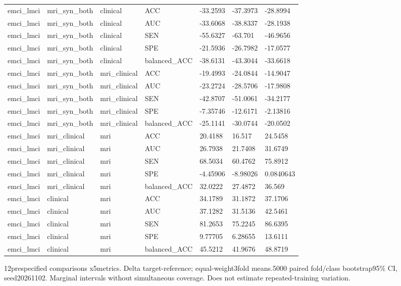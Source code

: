\begin{landscape}
\begin{longtable}{lllllll}
emci\_lmci & mri\_syn\_both & clinical & ACC & -33.2593 & -37.3973 & -28.8994 \\
emci\_lmci & mri\_syn\_both & clinical & AUC & -33.6068 & -38.8337 & -28.1938 \\
emci\_lmci & mri\_syn\_both & clinical & SEN & -55.6327 & -63.701 & -46.9656 \\
emci\_lmci & mri\_syn\_both & clinical & SPE & -21.5936 & -26.7982 & -17.0577 \\
emci\_lmci & mri\_syn\_both & clinical & balanced\_ACC & -38.6131 & -43.3044 & -33.6618 \\
emci\_lmci & mri\_syn\_both & mri\_clinical & ACC & -19.4993 & -24.0844 & -14.9047 \\
emci\_lmci & mri\_syn\_both & mri\_clinical & AUC & -23.2724 & -28.5706 & -17.9808 \\
emci\_lmci & mri\_syn\_both & mri\_clinical & SEN & -42.8707 & -51.0061 & -34.2177 \\
emci\_lmci & mri\_syn\_both & mri\_clinical & SPE & -7.35746 & -12.6171 & -2.13816 \\
emci\_lmci & mri\_syn\_both & mri\_clinical & balanced\_ACC & -25.1141 & -30.0744 & -20.0502 \\
emci\_lmci & mri\_clinical & mri & ACC & 20.4188 & 16.517 & 24.5458 \\
emci\_lmci & mri\_clinical & mri & AUC & 26.7938 & 21.7408 & 31.6749 \\
emci\_lmci & mri\_clinical & mri & SEN & 68.5034 & 60.4762 & 75.8912 \\
emci\_lmci & mri\_clinical & mri & SPE & -4.45906 & -8.98026 & 0.0840643 \\
emci\_lmci & mri\_clinical & mri & balanced\_ACC & 32.0222 & 27.4872 & 36.569 \\
emci\_lmci & clinical & mri & ACC & 34.1789 & 31.1872 & 37.1706 \\
emci\_lmci & clinical & mri & AUC & 37.1282 & 31.5136 & 42.5461 \\
emci\_lmci & clinical & mri & SEN & 81.2653 & 75.2245 & 86.6395 \\
emci\_lmci & clinical & mri & SPE & 9.77705 & 6.28655 & 13.6111 \\
emci\_lmci & clinical & mri & balanced\_ACC & 45.5212 & 41.9676 & 48.8719 \\
\end{longtable}
\noindent\parbox{\linewidth}{\footnotesize 12prespecified comparisons x5metrics. Delta target-reference; equal-weight3fold means.5000 paired fold/class bootstrap95\% CI, seed20261102. Marginal intervals without simultaneous coverage. Does not estimate repeated-training variation.}
\endgroup
\end{landscape}
